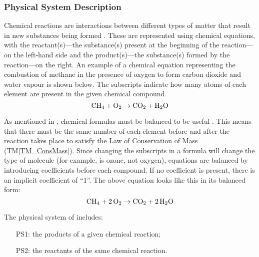 \documentclass[12pt]{article}
\newcommand{\tmref}[1]{TM\ref{#1}}
\begin{document}
\subsubsection{Physical System Description} \label{sec_phySystDesc}

Chemical reactions are interactions between different types of matter that
result in new substances being formed \cite[p.~286]{lund_introduction_2023}.
These are represented using chemical equations, with the reactant(s)---the
substance(s) present at the beginning of the reaction---on the left-hand side
and the product(s)---the substance(s) formed by the reaction---on the right. An
example of a chemical equation representing the combustion of methane in the
presence of oxygen to form carbon dioxide and water vapour is shown below. The
subscripts indicate how many atoms of each element are present in the given
chemical compound.
$$
  \ce{CH4} + \ce{O2} \rightarrow \ce{CO2} + \ce{H2O}
$$

As mentioned in , chemical formulas must be balanced to be
useful \cite{lund_introduction_2023}. This means that there
must be the same number of each element before and after the reaction takes
place to satisfy the Law of Conservation of Mass (\tmref{TM_ConsMass}). Since
changing the subscripts in a formula will change the type of molecule (for
example,  is ozone, not oxygen), equations are balanced by introducing
coefficients before each compound. If no coefficient is present, there is an
implicit coefficient of ``1''. The above equation looks like this in its
balanced form:
$$
  \ce{CH4} + \ce{2O2} \rightarrow \ce{CO2} + \ce{2H2O}
$$

The physical system of \progname{} includes:

\begin{itemize}

  \item[PS1:] the products of a given chemical reaction;

  \item[PS2:] the reactants of the same chemical reaction.

\end{itemize}

\end{document}
